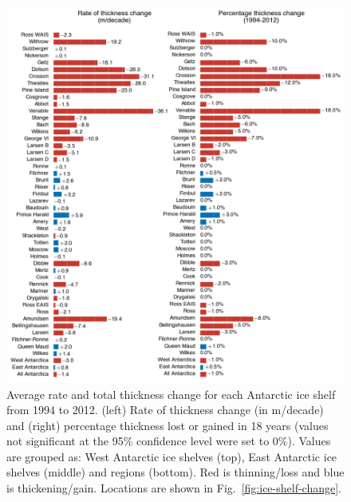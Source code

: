 \begin{figure}[!h]
  \centering
  \includegraphics[width=\textwidth]{img/Sup2_barchart1_review_v7.png}
  \caption[Average rate and total thickness change (ice shelves)]{
  Average rate and total thickness change for each Antarctic ice shelf from 1994 to 2012. (left) Rate of thickness change (in m/decade) and (right) percentage thickness lost or gained in 18 years (values not significant at the 95\% confidence level were set to 0\%). Values are grouped as: West Antarctic ice shelves (top), East Antarctic ice shelves (middle) and regions (bottom). Red is thinning/loss and blue is thickening/gain. Locations are shown in Fig.~\ref{fig:ice-shelf-change}.
  }
  \label{c3f6}
\end{figure}



